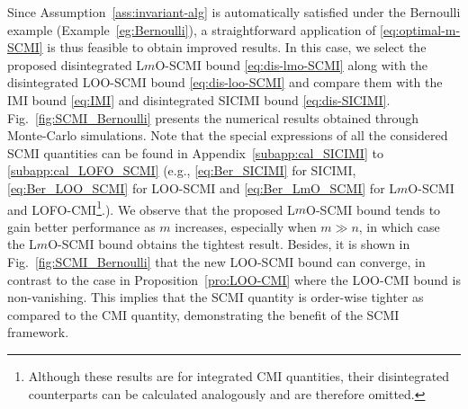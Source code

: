 \documentclass[onecolumn,romanappendices,10pt]{IEEEtran}
\begin{document}
	Since Assumption~\ref{ass:invariant-alg} is automatically satisfied under the Bernoulli example (Example~\ref{eg:Bernoulli}), a straightforward application of \eqref{eq:optimal-m-SCMI} is thus feasible to obtain improved results. In this case, we select the proposed disintegrated L$m$O-SCMI bound \eqref{eq:dis-lmo-SCMI} along with the disintegrated LOO-SCMI bound \eqref{eq:dis-loo-SCMI} and compare them with the IMI bound \eqref{eq:IMI} and disintegrated SICIMI bound \eqref{eq:dis-SICIMI}. Fig.~\ref{fig:SCMI_Bernoulli} presents the numerical results obtained through Monte-Carlo simulations. Note that the special expressions of all the considered SCMI quantities can be found in Appendix~\ref{subapp:cal_SICIMI} to \ref{subapp:cal_LOFO_SCMI} (e.g., \eqref{eq:Ber_SICIMI} for SICIMI, \eqref{eq:Ber_LOO_SCMI} for LOO-SCMI and \eqref{eq:Ber_LmO_SCMI} for L$m$O-SCMI and LOFO-CMI\footnote{Although these results are for integrated CMI quantities, their disintegrated counterparts can be calculated analogously and are therefore omitted.}.). We observe that the proposed L$m$O-SCMI bound tends to gain better performance as $m$ increases, especially when $m \gg n$, in which case the L$m$O-SCMI bound obtains the tightest result. Besides, it is shown in Fig.~\ref{fig:SCMI_Bernoulli} that the new LOO-SCMI bound can converge, in contrast to the case in Proposition~\ref{pro:LOO-CMI} where the LOO-CMI bound is non-vanishing. This implies that the SCMI quantity is order-wise tighter as compared to the CMI quantity, demonstrating the benefit of the SCMI framework.
	
\end{document}
